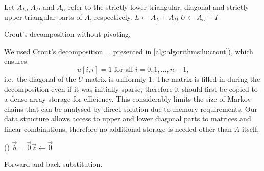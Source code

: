 \begin{algorithm}
  Let $A_L$, $A_D$ and $A_U$ refer to the strictly lower triangular,
  diagonal and strictly upper triangular parts of $A$, respectively.\;
  $L \gets A_L + A_D$\;
  $U \gets A_U + I$\;
  \;
  \caption{Crout's  decomposition without pivoting.}
  \label{alg:algorithms:lu:crout}
\end{algorithm}

We used Crout's  decomposition%
~\citep[Section~2.3.1]{press2007numerical}, presented in
\vref{alg:algorithms:lu:crout}), which ensures
\begin{equation}
  u[i, i] = 1 \text{ for all $i = 0, 1, \ldots, n - 1$,}
\end{equation}
i.e.~the diagonal of the $U$ matrix is uniformly $1$. The matrix is
filled in during the decomposition even if it was initially sparse,
therefore it should first be copied to a dense array storage for
efficiency. This considerably limits the size of Markov chains that
can be analysed by direct solution due to memory requirements. Our
data structure allows access to upper and lower diagonal parts to
matrices and linear combinations, therefore no additional storage is
needed other than $A$ itself.

\begin{algorithm}
  \;
  \lIf()
  {$\vec{b} = \vec{0}$}{$\vec{z} \gets \vec{0}$}
   
  \;
  \caption{Forward and back substitution.}
  \label{alg:algorithms:lu:substitution}
\end{algorithm}

